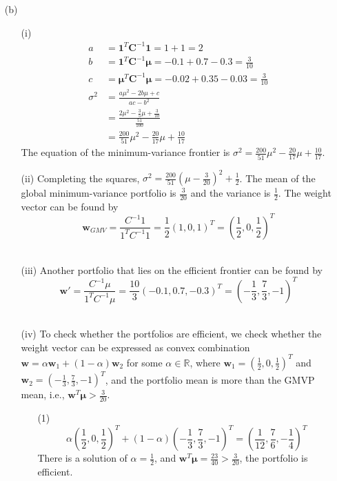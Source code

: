 \documentclass{article}
\begin{document}
\begin{enumerate}
\begin{itemize}
\item[(b)]
\begin{itemize}
\item[(i)]
\begin{align*}
a&=\mathbf{1}^T\mathbf{C}^{-1}\mathbf{1}=1+1=2 \\
b&=\mathbf{1}^T\mathbf{C}^{-1}\boldsymbol\mu=-0.1+0.7-0.3=\frac{3}{10} \\
c&=\boldsymbol\mu^{T}\mathbf{C}^{-1}\boldsymbol\mu=-0.02+0.35-0.03=\frac{3}{10} \\
\sigma^2 &= \frac{a\mu^2-2b\mu+c}{ac-b^2} \\
&=\frac{2\mu^2-\frac{3}{5}\mu+\frac{3}{10}}{\frac{51}{100}} \\
&=\frac{200}{51}\mu^2-\frac{20}{17}\mu+\frac{10}{17}
\end{align*}
The equation of the minimum-variance frontier is $\displaystyle\sigma^2=\frac{200}{51}\mu^2-\frac{20}{17}\mu+\frac{10}{17}$.
\\
\item[(ii)]
Completing the squares, $\sigma^2=\frac{200}{51}(\mu-\frac{3}{20})^2+\frac{1}{2}$.
\newline
The mean of the global minimum-variance portfolio is $\frac{3}{20}$ and the variance is $\frac{1}{2}$.
\newline
The weight vector can be found by 
\[\mathbf{w}_{GMV}=\frac{C^{-1}1}{1^TC^{-1}1}=\frac{1}{2}(1,0,1)^T=\left(\frac{1}{2},0,\frac{1}{2}\right)^T\]
\\
\item[(iii)]
Another portfolio that lies on the efficient frontier can be found by
\[\mathbf{w}'=\frac{C^{-1}\mu}{1^TC^{-1}\mu}=\frac{10}{3}(-0.1,0.7,-0.3)^T=\left(-\frac{1}{3},\frac{7}{3},-1\right)^T\]
\\
\item[(iv)]
To check whether the portfolios are efficient, we check whether the weight vector can be expressed as convex combination $\mathbf{w}=\alpha \mathbf{w}_1+(1-\alpha)\mathbf{w}_2$ for some $\alpha \in \mathbb{R}$, where $\mathbf{w}_1=\left(\frac{1}{2},0,\frac{1}{2}\right)^T$ and $\mathbf{w}_2=\left(-\frac{1}{3},\frac{7}{3},-1\right)^T$, and the portfolio mean is more than the GMVP mean, i.e., $\mathbf{w}^T\boldsymbol\mu>\frac{3}{20}$.
\begin{itemize}
\item[(1)]
\[\alpha \left(\frac{1}{2},0,\frac{1}{2}\right)^T+(1-\alpha) \left(-\frac{1}{3},\frac{7}{3},-1\right)^T = \left(\frac{1}{12},\frac{7}{6},-\frac{1}{4}\right)^T\]
There is a solution of $\alpha=\frac{1}{2}$, and $\mathbf{w}^T\boldsymbol\mu=\frac{23}{40}>\frac{3}{20}$, the portfolio is efficient.


\end{itemize}
\end{itemize}
\end{itemize}
\end{enumerate}
\end{document}

